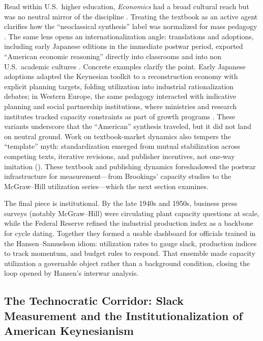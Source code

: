 \documentclass[11pt]{article}
\begin{document}
Read within U.S.\ higher education, \emph{Economics} had a broad cultural reach but was no neutral mirror of the discipline \citep{pearcehoover1995,colanderlandreth1996,colander2003}. Treating the textbook as an active agent clarifies how the ``neoclassical synthesis'' label was normalized for mass pedagogy \citep{devroey2004,backhouseboianovsky2016}. The same lens opens an internationalization angle: translations and adoptions, including early Japanese editions in the immediate postwar period, exported ``American economic reasoning'' directly into classrooms and into non U.S.\ academic cultures \citep{fourcade2009,giraud2018}. Concrete examples clarify the point. Early Japanese adoptions adapted the Keynesian toolkit to a reconstruction economy with explicit planning targets, folding utilization into industrial rationalization debates; in Western Europe, the same pedagogy interacted with indicative planning and social partnership institutions, where ministries and research institutes tracked capacity constraints as part of growth programs \citep{fourcade2009}. These variants underscore that the ``American'' synthesis traveled, but it did not land on neutral ground. Work on textbook-market dynamics also tempers the ``template'' myth: standardization emerged from mutual stabilization across competing texts, iterative revisions, and publisher incentives, not one-way imitation (\citealp{colander2003,giraud2018}). These textbook and publishing dynamics foreshadowed the postwar infrastructure for measurement---from Brookings' capacity studies to the McGraw--Hill utilization series---which the next section examines.

The final piece is institutional. By the late 1940s and 1950s, business press surveys (notably McGraw--Hill) were circulating plant capacity questions at scale, while the Federal Reserve refined the industrial production index as a backbone for cycle dating. Together they formed a usable dashboard for officials trained in the Hansen--Samuelson idiom: utilization rates to gauge slack, production indices to track momentum, and budget rules to respond. That ensemble made capacity utilization a governable object rather than a background condition, closing the loop opened by Hansen's interwar analysis.


\subsection{The Technocratic Corridor: Slack Measurement and the Institutionalization of American Keynesianism}
\label{subsec:technocratic_corridor}
\end{document}
